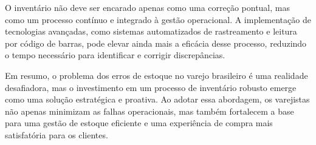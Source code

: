 O inventário não deve ser encarado apenas como uma correção pontual, mas como um processo contínuo e integrado à gestão operacional. A implementação de tecnologias avançadas, como sistemas automatizados de rastreamento e leitura por código de barras, pode elevar ainda mais a eficácia desse processo, reduzindo o tempo necessário para identificar e corrigir discrepâncias.

Em resumo, o problema dos erros de estoque no varejo brasileiro é uma realidade desafiadora, mas o investimento em um processo de inventário robusto emerge como uma solução estratégica e proativa. Ao adotar essa abordagem, os varejistas não apenas minimizam as falhas operacionais, mas também fortalecem a base para uma gestão de estoque eficiente e uma experiência de compra mais satisfatória para os clientes.
